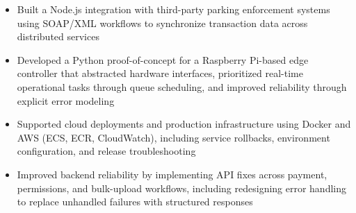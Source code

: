 \documentclass[10pt,a4paper,ragged2e, normalphoto]{altacv}
\begin{document}
\begin{fullwidth}
\makecvheader
\end{fullwidth}


\begin{itemize}
\item Built a Node.js integration with third-party parking enforcement systems using SOAP/XML workflows to synchronize transaction data across distributed services
\item Developed a Python proof-of-concept for a Raspberry Pi-based edge controller that abstracted hardware interfaces, prioritized real-time operational tasks through queue scheduling, and improved reliability through explicit error modeling
\item Supported cloud deployments and production infrastructure using Docker and AWS (ECS, ECR, CloudWatch), including service rollbacks, environment configuration, and release troubleshooting
\item Improved backend reliability by implementing API fixes across payment, permissions, and bulk-upload workflows, including redesigning error handling to replace unhandled failures with structured responses

\end{itemize}

\divider
\end{document}
